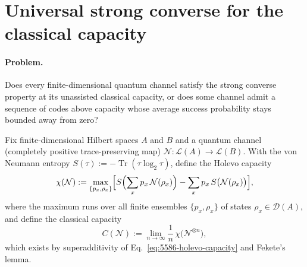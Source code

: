 \section{Universal strong converse for the classical capacity}
\label{sec:op_55869a5fec880498}

\paragraph{Problem.}
Does every finite-dimensional quantum channel satisfy the strong converse
property at its unassisted classical capacity, or does some channel admit a
sequence of codes above capacity whose average success probability stays
bounded away from zero?

Fix finite-dimensional Hilbert spaces $A$ and $B$ and a quantum channel
(completely positive trace-preserving map) $\mathcal N:\mathcal L(A)\to\mathcal L(B)$.
With the von Neumann entropy
$S(\tau):=-\operatorname{Tr}(\tau\log_2\tau)$, define the Holevo capacity
\begin{equation}
  \chi(\mathcal N):=\max_{\{p_x,\rho_x\}}
  \Bigl[S\Bigl(\sum_x p_x\,\mathcal N(\rho_x)\Bigr)
  -\sum_x p_x\,S\bigl(\mathcal N(\rho_x)\bigr)\Bigr],
  \label{eq:5586-holevo-capacity}
\end{equation}
where the maximum runs over all finite ensembles $\{p_x,\rho_x\}$ of states
$\rho_x\in\mathcal D(A)$, and define the classical capacity
\begin{equation}
  C(\mathcal N):=\lim_{n\to\infty}\frac1n\,\chi\bigl(\mathcal N^{\otimes n}\bigr),
  \label{eq:5586-classical-capacity}
\end{equation}
which exists by superadditivity of Eq.~\eqref{eq:5586-holevo-capacity} and
Fekete's lemma.

